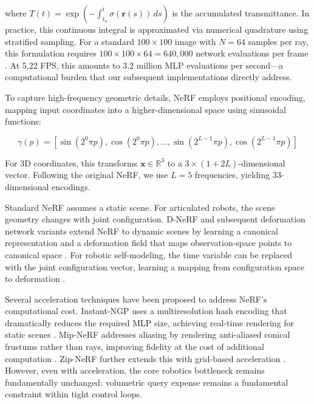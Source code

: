 \documentclass[12pt,a4paper,oneside]{report}
\begin{document}
where $T(t) = \exp\left(-\int_{t_n}^{t} \sigma(\mathbf{r}(s)) \, ds\right)$ is the accumulated transmittance. In practice, this continuous integral is approximated via numerical quadrature using stratified sampling. For a standard $100 \times 100$ image with $N = 64$ samples per ray, this formulation requires $100 \times 100 \times 64 = 640,000$ network evaluations per frame \cite{mildenhall2020nerf}. At 5.22 FPS, this amounts to 3.2 million MLP evaluations per second—a computational burden that our subsequent implementations directly address.

To capture high-frequency geometric details, NeRF employs positional encoding, mapping input coordinates into a higher-dimensional space using sinusoidal functions:

\begin{equation}
\gamma(p) = [\sin(2^0 \pi p), \cos(2^0 \pi p), \ldots, \sin(2^{L-1} \pi p), \cos(2^{L-1} \pi p)]
\end{equation}

For 3D coordinates, this transforms $\mathbf{x} \in \mathbb{R}^3$ to a $3 \times (1 + 2L)$-dimensional vector. Following the original NeRF, we use $L = 5$ frequencies, yielding 33-dimensional encodings.

Standard NeRF assumes a static scene. For articulated robots, the scene geometry changes with joint configuration. D-NeRF and subsequent deformation network variants extend NeRF to dynamic scenes by learning a canonical representation and a deformation field that maps observation-space points to canonical space \cite{pumarola2021d, park2021nerfies}. For robotic self-modeling, the time variable can be replaced with the joint configuration vector, learning a mapping from configuration space to deformation \cite{hu2024teaching}.

Several acceleration techniques have been proposed to address NeRF's computational cost. Instant-NGP uses a multiresolution hash encoding that dramatically reduces the required MLP size, achieving real-time rendering for static scenes \cite{muller2022instant}. Mip-NeRF addresses aliasing by rendering anti-aliased conical frustums rather than rays, improving fidelity at the cost of additional computation \cite{barron2021mip}. Zip-NeRF further extends this with grid-based acceleration \cite{barron2023zipnerf}. However, even with acceleration, the core robotics bottleneck remains fundamentally unchanged: volumetric query expense remains a fundamental constraint within tight control loops.
\end{document}
